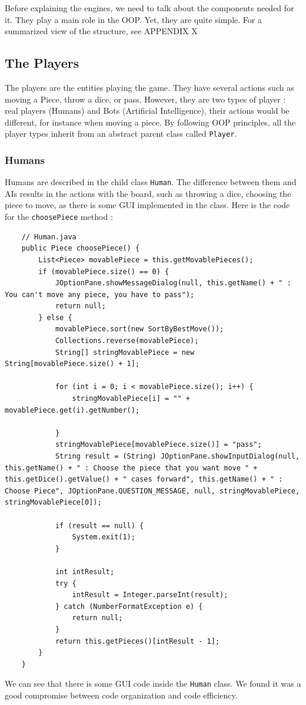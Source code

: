 \documentclass[english, 11pt, titlepage]{article}
\begin{document}
    Before explaining the engines, we need to talk about the components needed for it. They play a main role in the OOP. Yet, they are quite simple. For a summarized view of the structure, see APPENDIX X

    \subsection{The Players}
    The players are the entities playing the game. They have several actions such as moving a Piece, throw a dice, or pass. However, they are two types of player : real players (Humans) and Bots (Artificial Intelligence), their actions would be different, for instance when moving a piece. By following OOP principles, all the player types inherit from an abstract parent class called \verb|Player|. 
    \subsubsection{Humans}
    Humans are described in the child class \verb|Human|. The difference between them and AIs results in the actions with the board, such as throwing a dice, choosing the piece to move, as there is some GUI implemented in the class. Here is the code for the \verb|choosePiece| method :
    \begin{lstlisting}
    // Human.java
    public Piece choosePiece() {
        List<Piece> movablePiece = this.getMovablePieces();
        if (movablePiece.size() == 0) {
            JOptionPane.showMessageDialog(null, this.getName() + " : You can't move any piece, you have to pass");
            return null;
        } else {
            movablePiece.sort(new SortByBestMove());
            Collections.reverse(movablePiece);
            String[] stringMovablePiece = new String[movablePiece.size() + 1];

            for (int i = 0; i < movablePiece.size(); i++) {
                stringMovablePiece[i] = "" + movablePiece.get(i).getNumber();

            }
            stringMovablePiece[movablePiece.size()] = "pass";
            String result = (String) JOptionPane.showInputDialog(null, this.getName() + " : Choose the piece that you want move " + this.getDice().getValue() + " cases forward", this.getName() + " : Choose Piece", JOptionPane.QUESTION_MESSAGE, null, stringMovablePiece, stringMovablePiece[0]);

            if (result == null) {
                System.exit(1);
            }

            int intResult;
            try {
                intResult = Integer.parseInt(result);
            } catch (NumberFormatException e) {
                return null;
            }
            return this.getPieces()[intResult - 1];
        }
    }
    \end{lstlisting}
    We can see that there is some GUI code inside the \verb|Human| class. We found it was a good compromise between code organization and code efficiency.
\end{document}

